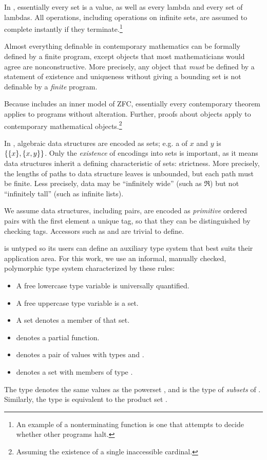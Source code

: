 \documentclass[preprint]{sigplanconf}
\begin{document}
In \lzfclang, essentially every set is a value, as well as every lambda and every set of lambdas.
All operations, including operations on infinite sets, are assumed to complete instantly if they terminate.\footnote{An
example of a nonterminating \lzfclang function is one that attempts to decide whether other \lzfclang programs halt.}

Almost everything definable in contemporary mathematics can be formally defined by a finite \lzfclang program, except objects that most mathematicians would agree are nonconstructive.
More precisely, any object that \emph{must} be defined by a statement of existence and uniqueness without giving a bounding set is not definable by a \emph{finite} \lzfclang program.

Because \lzfclang includes an inner model of ZFC, essentially every contemporary theorem applies to \lzfclang programs without alteration.
Further, proofs about \lzfclang objects apply to contemporary mathematical objects.\footnote{Assuming the existence of a single inaccessible cardinal.}

In \lzfclang, algebraic data structures are encoded as sets; e.g. a  of $x$ and $y$ is $\{{\{{x}\},\{{x,y}\}}\}$.
Only the \emph{existence} of encodings into sets is important, as it means data structures inherit a defining characteristic of sets: strictness.
More precisely, the lengths of paths to data structure leaves is unbounded, but each path must be finite.
Less precisely, data may be ``infinitely wide'' (such as $\Re$) but not ``infinitely tall'' (such as infinite lists).

We assume data structures, including pairs, are encoded as \emph{primitive} ordered pairs with the first element a unique tag, so that they can be distinguished by checking tags.
Accessors such as  and  are trivial to define.

\lzfclang is untyped so its users can define an auxiliary type system that best suits their application area.
For this work, we use an informal, manually checked, polymorphic type system characterized by these rules:
\begin{itemize}
	\item A free lowercase type variable is universally quantified.
	\item A free uppercase type variable is a set.
	\item A set denotes a member of that set.
	\item {} denotes a partial function.
	\item {} denotes a pair of values with types  and .
	\item {} denotes a set with members of type .
\end{itemize}
The type  denotes the same values as the powerset , and is the type of \emph{subsets} of .
Similarly, the type  is equivalent to the product set .
\end{document}
